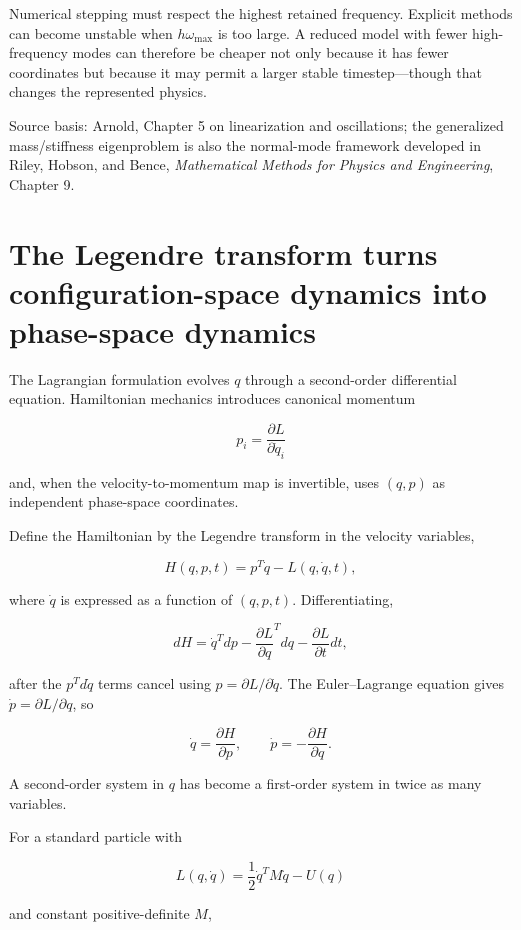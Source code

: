 Numerical stepping must respect the highest retained frequency. Explicit methods can become unstable when \(h\omega_{\max}\) is too large. A reduced model with fewer high-frequency modes can therefore be cheaper not only because it has fewer coordinates but because it may permit a larger stable timestep---though that changes the represented physics.

Source basis: Arnold, Chapter 5 on linearization and oscillations; the generalized mass/stiffness eigenproblem is also the normal-mode framework developed in Riley, Hobson, and Bence, \emph{Mathematical Methods for Physics and Engineering}, Chapter 9.

\section{The Legendre transform turns configuration-space dynamics into phase-space dynamics}\label{06-engine-ii-ch033-the-legendre-transform-turns-configuration-space-dynamics-into-phase-space-dynamics}

The Lagrangian formulation evolves \(q\) through a second-order differential equation. Hamiltonian mechanics introduces canonical momentum

\[
p_i
=
\frac{\partial L}{\partial\dot q_i}
\]

and, when the velocity-to-momentum map is invertible, uses \((q,p)\) as independent phase-space coordinates.

Define the Hamiltonian by the Legendre transform in the velocity variables,

\[
H(q,p,t)
=
p^T\dot q-L(q,\dot q,t),
\]

where \(\dot q\) is expressed as a function of \((q,p,t)\). Differentiating,

\[
dH
=
\dot q^Tdp
-
\frac{\partial L}{\partial q}^Tdq
-
\frac{\partial L}{\partial t}dt,
\]

after the \(p^Td\dot q\) terms cancel using \(p=\partial L/\partial\dot q\). The Euler--Lagrange equation gives \(\dot p=\partial L/\partial q\), so

\[
\boxed{
\dot q=
\frac{\partial H}{\partial p},
\qquad
\dot p=
-\frac{\partial H}{\partial q}.
}
\]

A second-order system in \(q\) has become a first-order system in twice as many variables.

For a standard particle with

\[
L(q,\dot q)
=
\frac12\dot q^TM\dot q-U(q)
\]

and constant positive-definite \(M\),

